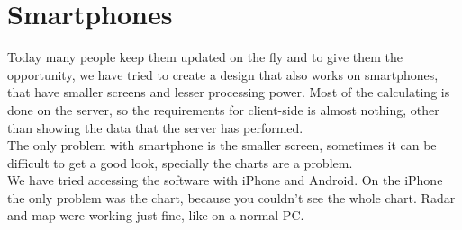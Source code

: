 \chapter{Smartphones}
Today many people keep them updated on the fly and to give them the opportunity, we have tried to create a design that also works on smartphones, that have smaller screens and lesser processing power. Most of the calculating is done on the server, so the requirements for client-side is almost nothing, other than showing the data that the server has performed.\\
The only problem with smartphone is the smaller screen, sometimes it can be difficult to get a good look, specially the charts are a problem.\\
We have tried accessing the software with iPhone and Android. On the iPhone the only problem was the chart, because you couldn't see the whole chart. Radar and map were working just fine, like on a normal PC.